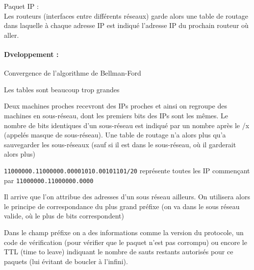 \noindent Paquet IP : \\

Les routeurs (interfaces entre différents réseaux) garde alors une table de routage dans laquelle à chaque adresse IP est indiqué l'adresse IP du prochain routeur où aller.

\paragraph{Dveloppement :} Convergence de l'algorithme de Bellman-Ford

\begin{personalise}[Problème]
	Les tables sont beaucoup trop grandes
\end{personalise}

\begin{personalise}[Solution]
	Deux machines proches recevront des IPs proches et ainsi on regroupe des machines en sous-réseau, dont les premiers bits des IPs sont les mêmes. Le nombre de bits identiques d'un sous-réseau est indiqué par un nombre après le /x (appelés masque de sous-réseau). Une table de routage n'a alors plus qu'a sauvegarder les sous-réseaux (sauf si il est dans le sous-réseau, où il garderait alors plus)
\end{personalise}

\begin{example}
	\texttt{11000000.11000000.00001010.00101101/20} représente toutes les IP commençant par \texttt{11000000.11000000.0000}
\end{example}

\begin{principe}
	Il arrive que l'on attribue des adresses d'un sous réseau ailleurs. On utilisera alors le principe de correspondance du plus grand préfixe (on va dans le sous réseau valide, où le plus de bits correspondent)
\end{principe}

\begin{rem}
	Dans le champ préfixe on a des informations comme la version du protocole, un code de vérification (pour vérifier que le paquet n'est pas corrompu) ou encore le TTL (time to leave) indiquant le nombre de sauts restants autorisés pour ce paquets (lui évitant de boucler à l'infini).
\end{rem}

